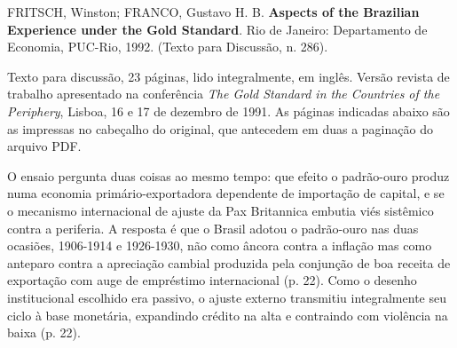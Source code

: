 
\begin{identificacao}
FRITSCH, Winston; FRANCO, Gustavo H. B. \textbf{Aspects of the Brazilian Experience under the Gold Standard}. Rio de Janeiro: Departamento de Economia, PUC-Rio, 1992. (Texto para Discussão, n. 286).

Texto para discussão, 23 páginas, lido integralmente, em inglês. Versão revista de trabalho apresentado na conferência \textit{The Gold Standard in the Countries of the Periphery}, Lisboa, 16 e 17 de dezembro de 1991. As páginas indicadas abaixo são as impressas no cabeçalho do original, que antecedem em duas a paginação do arquivo PDF.
\end{identificacao}


O ensaio pergunta duas coisas ao mesmo tempo: que efeito o padrão-ouro produz numa economia primário-exportadora dependente de importação de capital, e se o mecanismo internacional de ajuste da Pax Britannica embutia viés sistêmico contra a periferia. A resposta é que o Brasil adotou o padrão-ouro nas duas ocasiões, 1906-1914 e 1926-1930, não como âncora contra a inflação mas como anteparo contra a apreciação cambial produzida pela conjunção de boa receita de exportação com auge de empréstimo internacional (p. 22). Como o desenho institucional escolhido era passivo, o ajuste externo transmitiu integralmente seu ciclo à base monetária, expandindo crédito na alta e contraindo com violência na baixa (p. 22).


